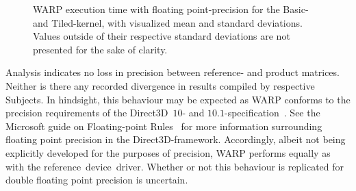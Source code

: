 \begin{figure}[htb]
\begin{center}
	\resizebox{ \columnwidth }{!}{}
	\caption{WARP execution time with floating point-precision for the Basic- and Tiled-kernel, with visualized mean and standard deviations. Values outside of their respective standard deviations are not presented for the sake of clarity.}
	\label{fig:contribution:results:warp:msswarp}
\end{center}
\end{figure}

Analysis indicates no loss in precision between reference- and product matrices.
Neither is there any recorded divergence in results compiled by respective Subjects.
In hindsight, this behaviour may be expected as WARP conforms to the precision requirements of the Direct3D~$10$- and $10.1$-specification~.
See the Microsoft guide on Floating-point Rules~ for more information surrounding floating point precision in the Direct3D-framework.
Accordingly, albeit not being explicitly developed for the purposes of precision, WARP performs equally as with the reference~device~driver.
Whether or not this behaviour is replicated for double floating point precision is uncertain.
